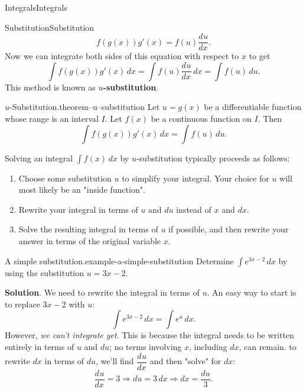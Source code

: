 \documentclass[10pt,]{book}
\newcommand{\terminology}[1]{\textbf{#1}}
\numberwithin{equation}{section}
\newcommand{\dv}[3][]{\dfrac{d^{#1} #2}{d #3^{#1}}}
\begin{document}
\begin{chapterptx}{Integrals}{}{Integrals}{}{}
\begin{sectionptx}{Substitution}{}{Substitution}{}{}
\begin{equation*}
f(g(x))g'(x) = f(u)\dv{u}{x}.
\end{equation*}
Now we can integrate both sides of this equation with respect to \(x\) to get%
\begin{equation*}
\int f(g(x))g'(x)\,dx = \int f(u)\dv{u}{x}\,dx = \int f(u)\,du.
\end{equation*}
This method is known as \terminology{\(u\)-substitution}.%
\begin{theorem}{\(u\)-Substitution.}{}{theorem--u--substitution}%
\hypertarget{p-479}{}%
Let \(u = g(x)\) be a differentiable function whose range is an interval \(I\). Let \(f(x)\) be a continuous function on \(I\). Then%
\begin{equation*}
\int f(g(x))g'(x)\,dx = \int f(u)\,du.
\end{equation*}
%
\end{theorem}
\hypertarget{p-480}{}%
Solving an integral \(\int f(x)\,dx\) by \(u\)-substitution typically proceeds as follows: \leavevmode%
\begin{enumerate}
\item\hypertarget{li-42}{}Choose some substitution \(u\) to simplify your integral. Your choice for \(u\) will most likely be an "inside function".%
\item\hypertarget{li-43}{}Rewrite your integral in terms of \(u\) and \(du\) instead of \(x\) and \(dx\).%
\item\hypertarget{li-44}{}Solve the resulting integral in terms of \(u\) if possible, and then rewrite your answer in terms of the original variable \(x\).%
\end{enumerate}
%
\begin{example}{A simple substitution.}{example-a-simple-substitution}%
\hypertarget{p-481}{}%
Determine \(\int e^{3x - 2}\,dx\) by using the substitution \(u = 3x - 2\).%
\par\smallskip%
\noindent\textbf{Solution}.\hypertarget{solution-105}{}\quad%
\hypertarget{p-482}{}%
We need to rewrite the integral in terms of \(u\). An easy way to start is to replace \(3x-2\) with \(u\):%
\begin{equation*}
\int e^{3x-2}\,dx = \int e^{u}\,dx.
\end{equation*}
However, \emph{we can't integrate yet}. This is because the integral needs to be written entirely in terms of \(u\) and \(du\); no terms involving \(x\), including \(dx\), can remain. to rewrite \(dx\) in terms of \(du\), we'll find \(\dv{u}{x}\) and then "solve" for \(dx\):%
\begin{equation*}
\dv{u}{x} = 3 \Rightarrow du = 3\,dx \Rightarrow dx = \frac{du}{3}.

\end{equation*}
\end{example}
\end{sectionptx}
\end{chapterptx}
\end{document}

